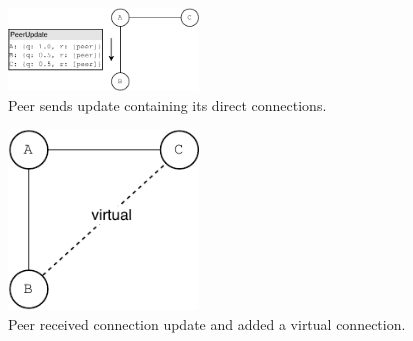 \begin{figure}
\centering
\includegraphics[width=0.45\textwidth]{graphics/design/peer-update-send.pdf}
\caption{Peer sends update containing its direct connections.}
\label{fig:peer-update-send}
\end{figure}

\begin{figure}
\centering
\includegraphics[width=0.45\textwidth]{graphics/design/peer-update-recv.pdf}
\caption{Peer received connection update and added a virtual connection.}
\label{fig:peer-update-recv}
\end{figure}
